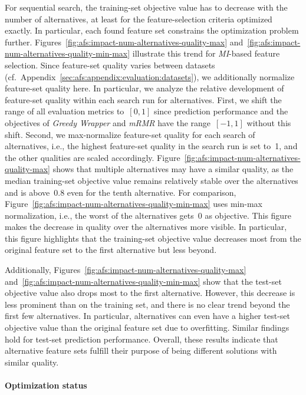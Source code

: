 \documentclass{article}
\theoremstyle{definition}
\begin{document}
For sequential search, the training-set objective value has to decrease with the number of alternatives, at least for the feature-selection criteria optimized exactly.
In particular, each found feature set constrains the optimization problem further.
Figures~\ref{fig:afs:impact-num-alternatives-quality-max} and~\ref{fig:afs:impact-num-alternatives-quality-min-max} illustrate this trend for \emph{MI}-based feature selection.
Since feature-set quality varies between datasets (cf.~Appendix~\ref{sec:afs:appendix:evaluation:datasets}), we additionally normalize feature-set quality here.
In particular, we analyze the relative development of feature-set quality within each search run for alternatives.
First, we shift the range of all evaluation metrics to~$[0,1]$ since prediction performance and the objectives of \emph{Greedy Wrapper} and \emph{mRMR} have the range~$[-1,1]$ without this shift.
Second, we max-normalize feature-set quality for each search of alternatives, i.e., the highest feature-set quality in the search run is set to~1, and the other qualities are scaled accordingly.
Figure~\ref{fig:afs:impact-num-alternatives-quality-max} shows that multiple alternatives may have a similar quality, as the median training-set objective value remains relatively stable over the alternatives and is above~0.8 even for the tenth alternative.
For comparison, Figure~\ref{fig:afs:impact-num-alternatives-quality-min-max} uses min-max normalization, i.e., the worst of the alternatives gets~0 as objective.
This figure makes the decrease in quality over the alternatives more visible.
In particular, this figure highlights that the training-set objective value decreases most from the original feature set to the first alternative but less beyond.

Additionally, Figures~\ref{fig:afs:impact-num-alternatives-quality-max} and~\ref{fig:afs:impact-num-alternatives-quality-min-max} show that the test-set objective value also drops most to the first alternative.
However, this decrease is less prominent than on the training set, and there is no clear trend beyond the first few alternatives.
In particular, alternatives can even have a higher test-set objective value than the original feature set due to overfitting.
Similar findings hold for test-set prediction performance.
Overall, these results indicate that alternative feature sets fulfill their purpose of being different solutions with similar quality.

\paragraph{Optimization status}
\end{document}
